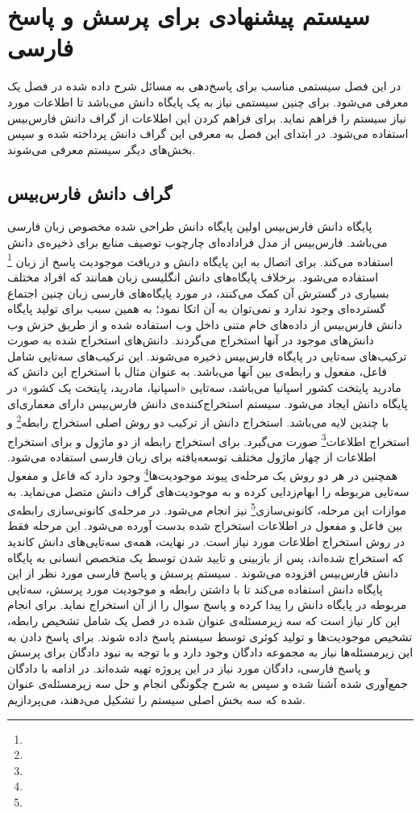 \chapter{سیستم پیشنهادی برای پرسش و پاسخ فارسی}
در این فصل سیستمی مناسب برای پاسخ‌دهی به مسائل شرح داده شده در فصل یک معرفی می‌شود. برای چنین سیستمی نیاز به یک پایگاه دانش می‌باشد تا اطلاعات مورد نیاز سیستم را فراهم نماید. برای فراهم کردن این اطلاعات از گراف دانش فارس‌بیس استفاده می‌شود. در ابتدای این فصل به معرفی این گراف دانش پرداخته شده و سپس بخش‌های دیگر سیستم معرفی می‌شوند.
\section{گراف دانش فارس‌بیس}
پایگاه دانش فارس‌بیس اولین پایگاه دانش طراحی شده مخصوص زبان فارسی می‌باشد.
فارس‌بیس از مدل فراداده‌ای چارچوب توصیف منابع برای ذخیره‌ی دانش استفاده می‌کند. برای اتصال به این پایگاه دانش و دریافت موجودیت پاسخ از زبان \footnote{} استفاده می‌شود.
برخلاف پایگاه‌های دانش انگلیسی زبان همانند  که افراد مختلف بسیاری در گسترش آن کمک می‌کنند، در مورد پایگاه‌های فارسی زبان چنین اجتماع گسترده‌ای وجود ندارد و نمی‌توان به آن اتکا نمود؛ به همین سبب برای تولید پایگاه دانش فارس‌بیس از داده‌های خام متنی داخل وب استفاده شده و از طریق خزش وب دانش‌های موجود در آنها استخراج می‌گردند.
دانش‌های استخراج شده به صورت ترکیب‌های سه‌تایی در پایگاه فارس‌بیس ذخیره می‌شوند. این ترکیب‌های سه‌تایی شامل فاعل، مفعول و رابطه‌ی بین آنها می‌باشد. به عنوان مثال با استخراج این دانش که مادرید پایتخت کشور اسپانیا می‌باشد، سه‌تایی «اسپانیا، مادرید، پایتخت یک کشور» در پایگاه دانش ایجاد می‌شود.
سیستم استخراج‌کننده‌ی دانش فارس‌بیس دارای معماری‌ای با چندین لایه می‌باشد. استخراج دانش از ترکیب دو روش اصلی استخراج رابطه\footnote{} و استخراج اطلاعات\footnote{} صورت می‌گیرد. برای استخراج رابطه از دو ماژول و برای استخراج اطلاعات از چهار ماژول مختلف توسعه‌یافته برای زبان فارسی استفاده می‌شود. همچنین در هر دو روش یک مرحله‌ی پیوند موجودیت‌ها\footnote{} وجود دارد که فاعل و مفعول سه‌تایی مربوطه را ابهام‌زدایی کرده و به موجودیت‌های گراف دانش متصل می‌نماید. به موازات این مرحله، کانونی‌‌سازی\footnote{} نیز انجام می‌شود. در مرحله‌ی کانونی‌سازی رابطه‌ی بین فاعل و مفعول در اطلاعات استخراج شده بدست آورده می‌شود. این مرحله فقط در روش استخراج اطلاعات مورد نیاز است. در نهایت، همه‌ی سه‌تایی‌های دانش کاندید که استخراج شده‌اند، پس از بازبینی و تایید شدن توسط یک متخصص انسانی به پایگاه دانش فارس‌بیس افزوده می‌شوند \cite{farsbase}.
سیستم پرسش و پاسخ فارسی مورد نظر از این پایگاه دانش استفاده می‌کند تا با داشتن رابطه و موجودیت مورد پرسش، سه‌تایی مربوطه در پایگاه دانش را پیدا کرده و پاسخ سوال را از آن استخراج نماید. برای انجام این کار نیاز است که سه زیرمسئله‌ی عنوان شده در فصل یک شامل تشخیص رابطه، تشخیص موجودیت‌ها و تولید کوئری توسط سیستم پاسخ داده شوند. برای پاسخ دادن به این زیرمسئله‌ها نیاز به مجموعه دادگان وجود دارد و با توجه به نبود دادگان برای پرسش و پاسخ فارسی، دادگان مورد نیاز در این پروژه تهیه شده‌اند. در ادامه با دادگان جمع‌آوری شده آشنا شده و سپس به شرح چگونگی انجام و حل سه زیرمسئله‌ی عنوان شده که سه بخش اصلی سیستم را تشکیل می‌دهند، می‌پردازیم.
